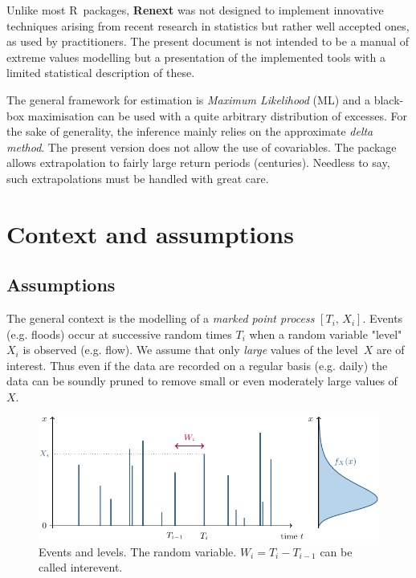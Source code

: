 \documentclass[a4paper]{report}
\begin{document}
Unlike most R~packages, \textbf{Renext} was not designed to implement
innovative techniques arising from recent research in statistics but
rather well accepted ones, as used by practitioners. The present
document is not intended to be a manual of extreme values modelling
but a presentation of the implemented tools with a limited statistical
description of these.

The general framework for estimation is \textit{Maximum Likelihood}
(ML) and a black-box maximisation can be used with a quite arbitrary
distribution of excesses. For the sake of generality, the inference
mainly relies on the approximate \textit{delta method}.  
The present version does not allow the use of covariables.
The package allows extrapolation to fairly large return periods
(centuries). Needless to say, such extrapolations must be handled with
great care.

\section{Context and assumptions}
\subsection{Assumptions}
\label{ASSUMPTIONS}
The general context is the modelling of a \textit{marked point process}
$[T_i,\,X_i]$.   Events (e.g. floods)
occur at successive random times $T_i$ when a random variable
"level"~$X_i$ is observed (e.g. flow).  We assume that only
\textit{large} values of the level~$X$ are of interest. Thus even if
the data are recorded on a regular basis (e.g. daily) the data can be
soundly pruned to remove small or even moderately large values of~$X$.

\begin{figure}
  \centering
  \includegraphics[width=12cm]{images/POT.pdf}
  \caption{\label{POT} Events and levels. The random variable.
    $W_i=T_i-T_{i-1}$ can be called interevent.}
\end{figure}
\end{document}

